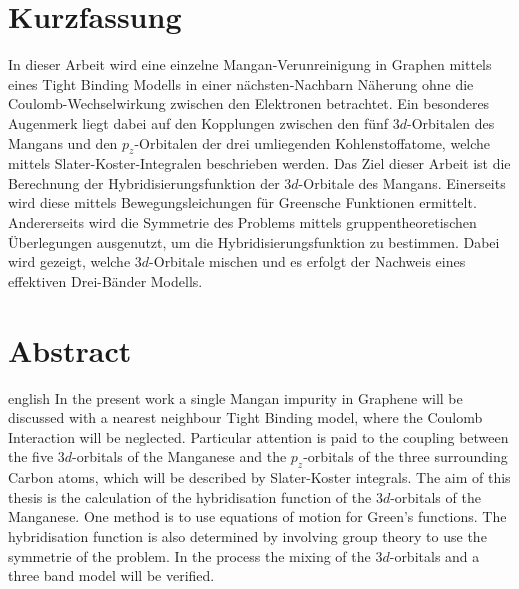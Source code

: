 \thispagestyle{plain}

\section*{Kurzfassung}
In dieser Arbeit wird eine einzelne Mangan-Verunreinigung in Graphen mittels eines Tight Binding Modells in einer nächsten-Nachbarn Näherung
ohne die Coulomb-Wechselwirkung zwischen den Elektronen betrachtet.
Ein besonderes Augenmerk liegt dabei auf den Kopplungen zwischen den fünf $3d$-Orbitalen des Mangans und den $p_z$-Orbitalen der drei umliegenden 
Kohlenstoffatome, welche mittels Slater-Koster-Integralen beschrieben werden.
Das Ziel dieser Arbeit ist die Berechnung der Hybridisierungsfunktion der $3d$-Orbitale des Mangans. 
Einerseits wird diese mittels Bewegungsleichungen für Greensche Funktionen ermittelt.
Andererseits wird die Symmetrie des Problems mittels gruppentheoretischen Überlegungen ausgenutzt, um die Hybridisierungsfunktion zu bestimmen.
Dabei wird gezeigt, welche $3d$-Orbitale mischen und es erfolgt der Nachweis eines effektiven Drei-Bänder Modells.
\section*{Abstract}
\begin{foreignlanguage}{english}
In the present work a single Mangan impurity in Graphene will be discussed with a nearest neighbour Tight Binding model, where
the Coulomb Interaction will be neglected.
Particular attention is paid to the coupling between the five $3d$-orbitals of the Manganese and the $p_z$-orbitals of the three
surrounding Carbon atoms, which will be described by Slater-Koster integrals.
The aim of this thesis is the calculation of the hybridisation function of the $3d$-orbitals of the Manganese.
One method is to use equations of motion for Green's functions. 
The hybridisation function is also determined by involving group theory to use the symmetrie of the problem.
In the process the mixing of the $3d$-orbitals and a three band model will be verified. 
\end{foreignlanguage}